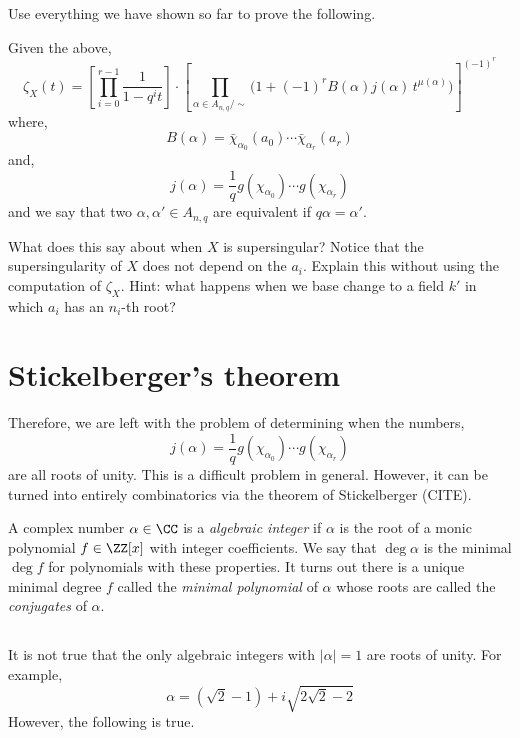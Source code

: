 \documentclass[12pt]{article}
\begin{document}
Use everything we have shown so far to prove the following.

\begin{theorem} \label{thm:diagonal_zeta_function}
Given the above,
\[ \zeta_X(t) = \left[ \prod_{i = 0}^{r-1} \frac{1}{1-q^i t} \right] \cdot  \left[ \prod_{\alpha \in A_{n,q} / \sim} \bigg( 1 + (-1)^r B(\alpha) j(\alpha) \, t^{\mu(\alpha)} \bigg) \right]^{(-1)^r} \]
where,
\[ B(\alpha) = \bar{\chi}_{\alpha_0}(a_0) \cdots \bar{\chi}_{\alpha_r}(a_r) \]
and,
\[ j(\alpha) = \frac{1}{q} g(\chi_{\alpha_0}) \cdots g(\chi_{\alpha_r}) \]
and we say that two $\alpha, \alpha' \in A_{n,q}$ are equivalent if $q \alpha = \alpha'$.
\end{theorem}

What does this say about when $X$ is supersingular? Notice that the supersingularity of $X$ does not depend on the $a_i$. Explain this without using the computation of $\zeta_X$. Hint: what happens when we base change to a field $k'$ in which $a_i$ has an $n_i$-th root?

\section{Stickelberger's theorem}

Therefore, we are left with the problem of determining when the numbers,
\[ j(\alpha) = \frac{1}{q} g(\chi_{\alpha_0}) \cdots g(\chi_{\alpha_r}) \]
are all roots of unity. This is a difficult problem in general. However, it can be turned into entirely combinatorics via the theorem of Stickelberger (CITE). 


\begin{defn}
A complex number $\alpha \in \CC$ is a \textit{algebraic integer} if $\alpha$ is the root of a monic polynomial $f \in \ZZ[x]$ with integer coefficients. We say that $\deg{\alpha}$ is the minimal $\deg{f}$ for polynomials with these properties. It turns out there is a unique minimal degree $f$ called the \textit{minimal polynomial} of $\alpha$ whose roots are called the \textit{conjugates} of $\alpha$.
\end{defn}

\subsection{}

It is not true that the only algebraic integers with $|\alpha| = 1$ are roots of unity. For example,
\[ \alpha = (\sqrt{2} - 1) + i \sqrt{2 \sqrt{2} - 2} \]
However, the following is true.
\end{document}
